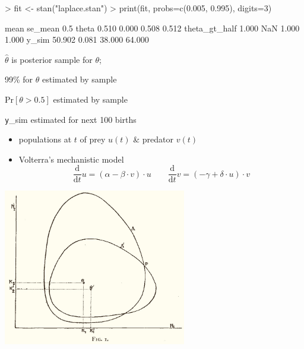 \documentclass[9pt]{report}
\begin{document}
%
\begin{codein}
> fit <- stan("laplace.stan")
> print(fit, probs=c(0.005, 0.995), digits=3)
\end{codein}
\begin{codeout}
                     mean se_mean   0.5%
theta               0.510   0.000  0.508   0.512
theta_gt_half       1.000     NaN  1.000   1.000
y_sim              50.902   0.081 38.000  64.000
\end{codeout}
%
\begin{subitemize}
\item {} $\hat{\theta}$ is posterior sample  for $\theta$;
\item 99\%  for $\theta$ estimated by sample 
\item $\textrm{Pr}[\theta > 0.5]$ estimated by sample 
\item {\texttt y\_sim} estimated  for next 100 births
\end{subitemize}



\begin{itemize}
\item populations at $t$ of prey $u(t)$ \& predator $v(t)$
\item Volterra's mechanistic model
$$
\frac{\textrm{d}}{\textrm{d}t}u = (\alpha - \beta \cdot v) \cdot u
\qquad
\frac{\textrm{d}}{\textrm{d}t}v = (-\gamma + \delta \cdot u) \cdot v
$$
\vspace*{-12pt}
\end{itemize}

\begin{center}
\includegraphics[width=0.6\textwidth]{img/volterra-solutions.jpg}
\end{center}
\end{document}
